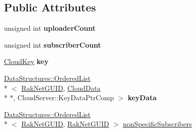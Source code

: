 \subsection*{Public Attributes}
\begin{DoxyCompactItemize}
\item 
\hypertarget{struct_rak_net_1_1_cloud_server_1_1_cloud_data_list_a94cccacd80e422f0bcc684ff43a16529}{unsigned int {\bfseries uploader\-Count}}\label{struct_rak_net_1_1_cloud_server_1_1_cloud_data_list_a94cccacd80e422f0bcc684ff43a16529}

\item 
\hypertarget{struct_rak_net_1_1_cloud_server_1_1_cloud_data_list_a0c356d916e36d1d16123e258f3aecaca}{unsigned int {\bfseries subscriber\-Count}}\label{struct_rak_net_1_1_cloud_server_1_1_cloud_data_list_a0c356d916e36d1d16123e258f3aecaca}

\item 
\hypertarget{struct_rak_net_1_1_cloud_server_1_1_cloud_data_list_ad947ebe72ebd22feab0348ced927948d}{\hyperlink{struct_rak_net_1_1_cloud_key}{Cloud\-Key} {\bfseries key}}\label{struct_rak_net_1_1_cloud_server_1_1_cloud_data_list_ad947ebe72ebd22feab0348ced927948d}

\item 
\hypertarget{struct_rak_net_1_1_cloud_server_1_1_cloud_data_list_ad7434f7ec25a829ce42ccd919aae17d2}{\hyperlink{class_data_structures_1_1_ordered_list}{Data\-Structures\-::\-Ordered\-List}\\*
$<$ \hyperlink{struct_rak_net_1_1_rak_net_g_u_i_d}{Rak\-Net\-G\-U\-I\-D}, \hyperlink{struct_rak_net_1_1_cloud_server_1_1_cloud_data}{Cloud\-Data} \\*
$\ast$, Cloud\-Server\-::\-Key\-Data\-Ptr\-Comp $>$ {\bfseries key\-Data}}\label{struct_rak_net_1_1_cloud_server_1_1_cloud_data_list_ad7434f7ec25a829ce42ccd919aae17d2}

\item 
\hyperlink{class_data_structures_1_1_ordered_list}{Data\-Structures\-::\-Ordered\-List}\\*
$<$ \hyperlink{struct_rak_net_1_1_rak_net_g_u_i_d}{Rak\-Net\-G\-U\-I\-D}, \hyperlink{struct_rak_net_1_1_rak_net_g_u_i_d}{Rak\-Net\-G\-U\-I\-D} $>$ \hyperlink{struct_rak_net_1_1_cloud_server_1_1_cloud_data_list_a04e1a204973c5df1d56d17f5d99f36ea}{non\-Specific\-Subscribers}
\end{DoxyCompactItemize}


